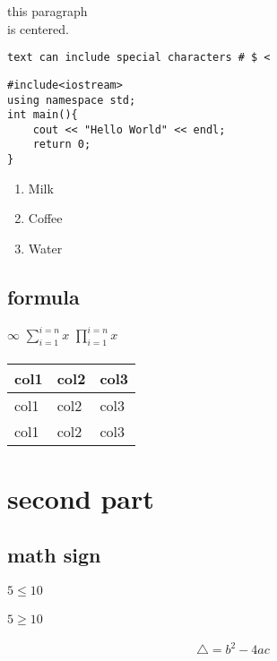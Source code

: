 \documentclass{article}
\begin{document}
\begin{center}
this paragraph \\
is centered.
\end{center}


\begin{verbatim}
text can include special characters # $ <
\end{verbatim}

\begin{verbatim}
#include<iostream>
using namespace std;
int main(){
	cout << "Hello World" << endl;
	return 0;
}
\end{verbatim}



\begin{enumerate}
\item Milk
\item Coffee
\item Water
\end{enumerate}

\subsection{formula}
$ \infty $
$  \sum_{i=1}^{i=n}{x}  $
$  \prod_{i=1}^{i=n}{x}  $


\paragraph{
\newline
}

\begin{tabular}{l|l|l}
col1 & col2 & col3 \\
\hline
col1 & col2 & col3 \\
\hline
col1 & col2 & col3 \\
\end{tabular}

\newpage

\section{second part}

\subsection{math sign}

\paragraph{
$ 5 \le 10   $
}

\paragraph{
$ 5 \ge 10   $
}

\begin{equation}
\triangle = b^{2} - 4ac
\end{equation}
\end{document}

